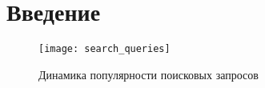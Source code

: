\clearpage
\section{Введение}

\begin{figure}
\centering
\label{fig:search_queries}
\texttt{[image: search\_queries]}
\caption{Динамика популярности поисковых запросов}
\end{figure}